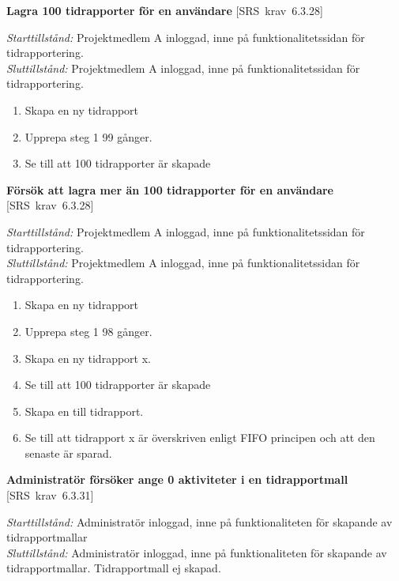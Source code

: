\documentclass[a4paper]{article}
\def\reqinside{\hfil\penalty 100 \hfilneg \hbox}
\def \req [#1]{\reqinside{[SRS krav #1]}}
\begin{document}
\begin{FT}

\item
\textbf{Lagra 100 tidrapporter för en användare} \req[6.3.28]

\emph{Starttillstånd:} Projektmedlem A inloggad, inne på funktionalitetssidan för tidrapportering.\\
\emph{Sluttillstånd:} Projektmedlem A inloggad, inne på funktionalitetssidan för tidrapportering.

\begin{enumerate}
\item Skapa en ny tidrapport
\item Upprepa steg 1 99 gånger.
\item Se till att 100 tidrapporter är skapade
\end{enumerate}

\item
\textbf{Försök att lagra mer än 100 tidrapporter för en användare} \req[6.3.28]

\emph{Starttillstånd:} Projektmedlem A inloggad, inne på funktionalitetssidan för tidrapportering.\\
\emph{Sluttillstånd:} Projektmedlem A inloggad, inne på funktionalitetssidan för tidrapportering.

\begin{enumerate}
\item Skapa en ny tidrapport
\item Upprepa steg 1 98 gånger.
\item Skapa en ny tidrapport x.
\item Se till att 100 tidrapporter är skapade
\item Skapa en till tidrapport. 
\item Se till att tidrapport x är överskriven enligt FIFO principen och att den senaste är sparad.
\end{enumerate}




\item
\textbf{Administratör försöker ange 0 aktiviteter i en tidrapportmall} \req[6.3.31]

\emph{Starttillstånd:} Administratör inloggad, inne på funktionaliteten för skapande av tidrapportmallar\\
\emph{Sluttillstånd:} Administratör inloggad, inne på funktionaliteten för skapande av tidrapportmallar. Tidrapportmall ej skapad.\\


\end{FT}
\end{document}
